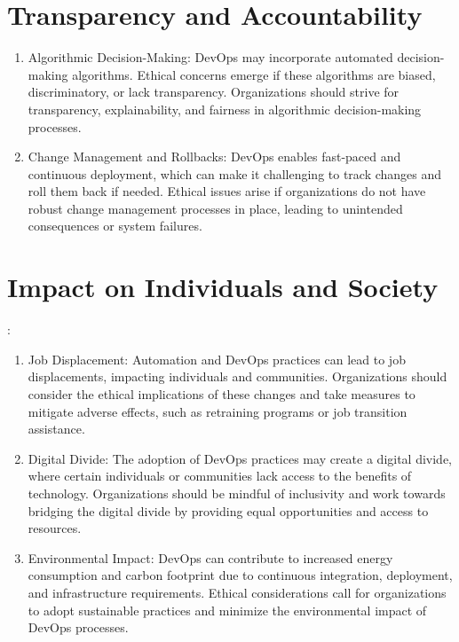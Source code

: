 \section*{Transparency and Accountability}
\begin{enumerate}
    \item Algorithmic Decision-Making: DevOps may incorporate automated decision-making algorithms. Ethical concerns emerge if these algorithms are biased, discriminatory, or lack transparency. Organizations should strive for transparency, explainability, and fairness in algorithmic decision-making processes.

    \item Change Management and Rollbacks: DevOps enables fast-paced and continuous deployment, which can make it challenging to track changes and roll them back if needed. Ethical issues arise if organizations do not have robust change management processes in place, leading to unintended consequences or system failures.
\end{enumerate}

\section*{Impact on Individuals and Society}:
\begin{enumerate}
    \item Job Displacement: Automation and DevOps practices can lead to job displacements, impacting individuals and communities. Organizations should consider the ethical implications of these changes and take measures to mitigate adverse effects, such as retraining programs or job transition assistance.

    \item Digital Divide: The adoption of DevOps practices may create a digital divide, where certain individuals or communities lack access to the benefits of technology. Organizations should be mindful of inclusivity and work towards bridging the digital divide by providing equal opportunities and access to resources.

    \item Environmental Impact: DevOps can contribute to increased energy consumption and carbon footprint due to continuous integration, deployment, and infrastructure requirements. Ethical considerations call for organizations to adopt sustainable practices and minimize the environmental impact of DevOps processes.
\end{enumerate}

